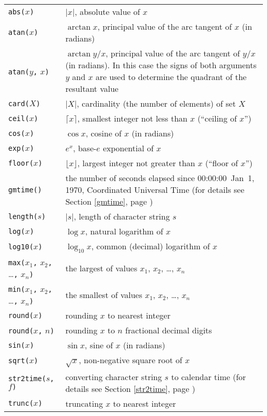\documentclass[11pt]{report}
\begin{document}
\begin{tabular}{@{}p{112pt}p{328pt}@{}}
{\tt abs(}$x${\tt)}&$|x|$, absolute value of $x$\\
{\tt atan(}$x${\tt)}&$\arctan x$, principal value of the arc tangent of
$x$ (in radians)\\
{\tt atan(}$y${\tt,} $x${\tt)}&$\arctan y/x$, principal value of the
arc tangent of $y/x$ (in radians). In this case the signs of both
arguments $y$ and $x$ are used to determine the quadrant of the
resultant value\\
{\tt card(}$X${\tt)}&$|X|$, cardinality (the number of elements) of
set $X$\\
{\tt ceil(}$x${\tt)}&$\lceil x\rceil$, smallest integer not less than
$x$ (``ceiling of $x$'')\\
{\tt cos(}$x${\tt)}&$\cos x$, cosine of $x$ (in radians)\\
{\tt exp(}$x${\tt)}&$e^x$, base-$e$ exponential of $x$\\
{\tt floor(}$x${\tt)}&$\lfloor x\rfloor$, largest integer not greater
than $x$ (``floor of $x$'')\\
{\tt gmtime()}&the number of seconds elapsed since 00:00:00~Jan~1, 1970,
Coordinated Universal Time (for details see Section \ref{gmtime},
page \pageref{gmtime})\\
{\tt length(}$s${\tt)}&$|s|$, length of character string $s$\\
{\tt log(}$x${\tt)}&$\log x$, natural logarithm of $x$\\
{\tt log10(}$x${\tt)}&$\log_{10}x$, common (decimal) logarithm of $x$\\
{\tt max(}$x_1${\tt,} $x_2${\tt,} \dots{\tt,} $x_n${\tt)}&the largest
of values $x_1$, $x_2$, \dots, $x_n$\\
{\tt min(}$x_1${\tt,} $x_2${\tt,} \dots{\tt,} $x_n${\tt)}&the smallest
of values $x_1$, $x_2$, \dots, $x_n$\\
{\tt round(}$x${\tt)}&rounding $x$ to nearest integer\\
{\tt round(}$x${\tt,} $n${\tt)}&rounding $x$ to $n$ fractional decimal
digits\\
{\tt sin(}$x${\tt)}&$\sin x$, sine of $x$ (in radians)\\
{\tt sqrt(}$x${\tt)}&$\sqrt{x}$, non-negative square root of $x$\\
{\tt str2time(}$s${\tt,} $f${\tt)}&converting character string $s$ to
calendar time (for details see Section \ref{str2time}, page
\pageref{str2time})\\
{\tt trunc(}$x${\tt)}&truncating $x$ to nearest integer\\

\end{tabular}
\end{document}
